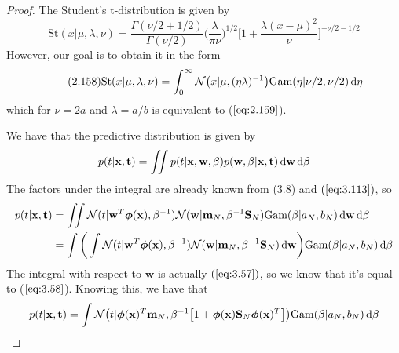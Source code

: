 \begin{proof}
    The Student's t-distribution is given by
    \begin{equation}\label{eq:2.159}\tag{2.159}
        \text{St}(x | \mu, \lambda, \nu)
        = \frac{\Gamma(\nu/2 + 1/2)}{\Gamma(\nu/2)} \bigg(\frac{\lambda}{\pi \nu}\bigg)^{1/2}
        \bigg[1 + \frac{\lambda(x - \mu)^2}{\nu}\bigg]^{-\nu/2 - 1/2}
    \end{equation}
    However, our goal is to obtain it in the form
    \begin{equation}\label{eq:2.158}\tag{2.158}
        \text{St}(x | \mu, \lambda, \nu)
        = \int_{0}^{\infty} \mathcal{N}\big(x | \mu, (\eta\lambda)^{-1}\big)
        \text{Gam}(\eta | \nu/2, \nu/2) \mathop{}\!\mathrm{d} \eta
    \end{equation}
    which for $\nu = 2a$ and $\lambda = a/b$ is equivalent to ($\ref{eq:2.159}$). 

    We have that the predictive distribution is given by
    \[
        p(t | \mathbf{x}, \mathbf{t}) 
        = \iint p(t | \mathbf{x}, \mathbf{w}, \beta) p(\mathbf{w}, \beta | \mathbf{x}, \mathbf{t})
        \mathop{}\!\mathrm{d} \mathbf{w} \mathop{}\!\mathrm{d} \beta
    \] 
    The factors under the integral are already known from (3.8) and 
    $(\ref{eq:3.113})$, so
    \begin{align*}
        p(t | \mathbf{x}, \mathbf{t}) 
        &= \iint \mathcal{N}(t | \mathbf{w}^T\bm{\phi}(\mathbf{x}), \beta^{-1}) 
            \mathcal{N}(\mathbf{w} | \mathbf{m}_N, \beta^{-1} \mathbf{S}_N) 
            \text{Gam}(\beta | a_N, b_N)
            \mathop{}\!\mathrm{d} \mathbf{w} \mathop{}\!\mathrm{d} \beta \\
        &= \int \bigg(\int \mathcal{N}(t | \mathbf{w}^T\bm{\phi}(\mathbf{x}), \beta^{-1}) 
            \mathcal{N}(\mathbf{w} | \mathbf{m}_N, \beta^{-1} \mathbf{S}_N) 
            \mathop{}\!\mathrm{d} \mathbf{w}\bigg)
            \text{Gam}(\beta | a_N, b_N)
            \mathop{}\!\mathrm{d} \beta
    \end{align*}
    The integral with respect to $\mathbf{w}$ is actually $(\ref{eq:3.57})$, so
    we know that it's equal to ($\ref{eq:3.58}$). Knowing this, we have that
    \[
        p(t | \mathbf{x}, \mathbf{t}) 
        = \int \mathcal{N}\big(t | \bm{\phi}(\mathbf{x})^T\mathbf{m}_N, 
        \beta^{-1} \big[1 + \bm{\phi}(\mathbf{x})\mathbf{S}_N\bm{\phi}(\mathbf{x})^T\big]\big)
        \text{Gam}(\beta | a_N, b_N) \mathop{}\!\mathrm{d} \beta
    \] 
\end{proof}

